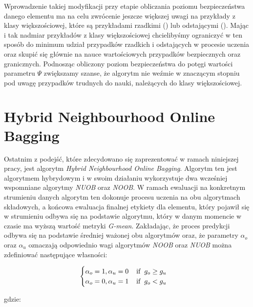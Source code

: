 \noindent Wprowadzenie takiej modyfikacji przy etapie obliczania poziomu bezpieczeństwa danego elementu ma na celu zwrócenie jeszcze większej uwagi na przykłady z klasy większościowej, które są przykładami rzadkimi () lub odstającymi (). Mając i tak nadmiar przykładów z klasy większościowej chcielibyśmy ograniczyć w ten sposób do minimum udział przypadków rzadkich i odstających w procesie uczenia oraz skupić się głównie na nauce wartościowych przypadków bezpiecznych oraz granicznych. Podnosząc obliczony poziom bezpieczeństwa do potęgi wartości parametru $\Psi$ zwiększamy szanse, że algorytm nie weźmie w znaczącym stopniu pod uwagę przypadków trudnych do nauki, należących do klasy większościowej.

\newpage

\section{Hybrid Neighbourhood Online Bagging}

\noindent Ostatnim z podejść, które zdecydowano się zaprezentować w ramach niniejszej pracy, jest algorytm \textit{Hybrid Neighbourhood Online Bagging}. Algorytm ten jest algorytmem hybrydowym i w swoim działaniu wykorzystuje dwa wcześniej wspomniane algorytmy \textit{NUOB} oraz \textit{NOOB}. W ramach ewaluacji na konkretnym strumieniu danych algorytm ten dokonuje procesu uczenia na obu algorytmach składowych, a końcowa ewaluacja finalnej etykiety dla elementu, który pojawił się w strumieniu odbywa się na podstawie algorytmu, który w danym momencie w czasie ma wyższą wartość metryki \textit{G-mean}. Zakładając, że proces predykcji odbywa się na podstawie średniej ważonej obu algorytmów oraz, że parametry $\alpha_o$ oraz $\alpha_u$ oznaczają odpowiednio wagi algorytmów \textit{NOOB} oraz \textit{NUOB} można zdefiniować następujące własności:

\begin{equation}
    \begin{cases}
    \alpha_o = 1, \alpha_u = 0 \hspace{4mm} \textrm{if} \hspace{2mm} g_o \geq g_u\\
    \alpha_o = 0, \alpha_u = 1 \hspace{4mm} \textrm{if} \hspace{2mm} g_o < g_u
    \end{cases}
\end{equation}

\noindent gdzie:

